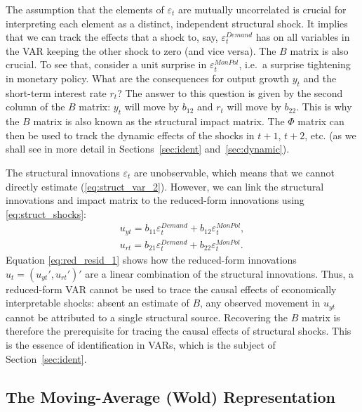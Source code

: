 \documentclass[12pt]{article}
\begin{document}
The assumption that the elements of $\varepsilon_{t}$ are mutually uncorrelated is crucial for interpreting each element as a distinct, independent structural shock. It implies that we can track the effects that a shock to, say, $\varepsilon_{t}^{Demand}$ has on all variables in the VAR keeping the other shock to zero (and vice versa). The $B$ matrix is also crucial. To see that, consider a unit surprise in $\varepsilon_{t}^{MonPol}$, i.e.\ a surprise tightening in monetary policy. What are the consequences for output growth $y_{t}$ and the short-term interest rate $r_{t}$? The answer to this question is given by the second column of the $B$ matrix: $y_{t}$ will move by $b_{12}$ and $r_{t}$ will move by $b_{22}$. This is why the $B$ matrix is also known as the structural impact matrix. The $\Phi $ matrix can then be used to track the dynamic effects of the shocks in $t+1$, $t+2$, etc. (as we shall see in more detail in Sections~\ref{sec:ident} and~\ref{sec:dynamic}).

The structural innovations $\varepsilon_{t}$ are unobservable, which means that we cannot directly estimate (\ref{eq:struct_var_2}). However, we can link the structural innovations and impact matrix to the reduced-form innovations using \eqref{eq:struct_shocks}:
\begin{equation}
	\begin{array}{c}
		u_{yt}=b_{11}\varepsilon_{t}^{Demand}+b_{12}\varepsilon_{t}^{MonPol},
		\\
		u_{rt}=b_{21}\varepsilon_{t}^{Demand}+b_{22}\varepsilon_{t}^{MonPol}.%
	\end{array}
	\label{eq:red_resid_1}
\end{equation}%
Equation \eqref{eq:red_resid_1} shows how the reduced-form innovations $u_{t}=\left( u_{yt}',u_{rt}'\right)'$ are a linear combination of the structural innovations. Thus, a reduced-form VAR cannot be used to trace the causal effects of economically interpretable shocks: absent an estimate of $B$, any observed movement in $u_{yt}$ cannot be attributed to a single structural source. Recovering the $B$ matrix is therefore the prerequisite for tracing the causal effects of structural shocks. This is the essence of identification in VARs, which is the subject of Section~\ref{sec:ident}.

\subsection{The Moving-Average (Wold) Representation}\label{sec:wold}
\end{document}
